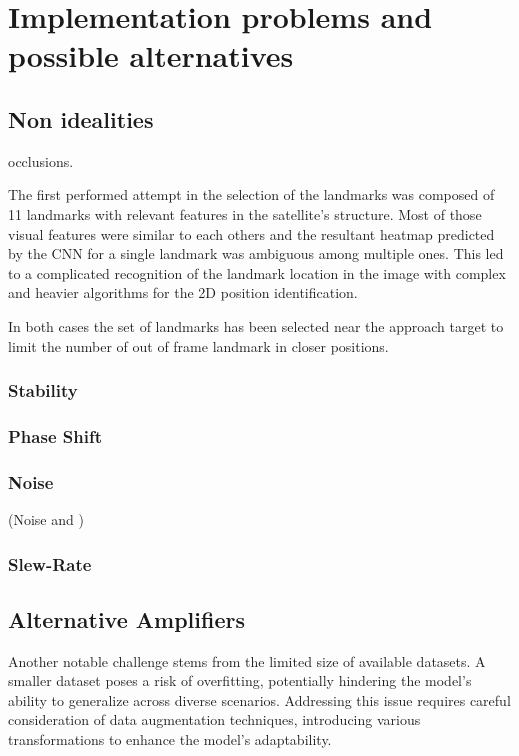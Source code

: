 \section{Implementation problems and possible alternatives}

\subsection{Non idealities}
\label{Chapter4/LandmarksSel}occlusions.

The first performed attempt in the selection of the landmarks was composed of 11 landmarks with relevant features in the satellite's structure. Most of those visual features were similar to each others and the resultant heatmap predicted by the CNN for a single landmark was ambiguous among multiple ones. This led to a complicated recognition of the landmark location in the image with complex and heavier algorithms for the 2D position identification.

In both cases the set of landmarks has been selected near the approach target to limit the number of out of frame landmark in closer positions.

\subsubsection{Stability}

\subsubsection{Phase Shift}

\subsubsection{Noise}
(Noise and )

\subsubsection{Slew-Rate}

\subsection{Alternative Amplifiers}
\label{Chapter4/DatasetAv}
Another notable challenge stems from the limited size of available datasets. A smaller dataset poses a risk of overfitting, potentially hindering the model's ability to generalize across diverse scenarios. Addressing this issue requires careful consideration of data augmentation techniques, introducing various transformations to enhance the model's adaptability.

